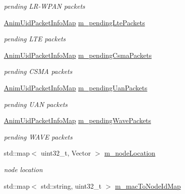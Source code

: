 \begin{DoxyCompactItemize}
\begin{DoxyCompactList}\small\item\em pending L\+R-\/\+W\+P\+AN packets \end{DoxyCompactList}\item 
\hyperlink{classns3_1_1AnimationInterface_afea577896009c4134df836bc20f1eabe}{Anim\+Uid\+Packet\+Info\+Map} \hyperlink{classns3_1_1AnimationInterface_abc07805734a4f250a8c791730cdffd67}{m\+\_\+pending\+Lte\+Packets}
\begin{DoxyCompactList}\small\item\em pending L\+TE packets \end{DoxyCompactList}\item 
\hyperlink{classns3_1_1AnimationInterface_afea577896009c4134df836bc20f1eabe}{Anim\+Uid\+Packet\+Info\+Map} \hyperlink{classns3_1_1AnimationInterface_ae80a577d450396d34df2499ec2c3c6ec}{m\+\_\+pending\+Csma\+Packets}
\begin{DoxyCompactList}\small\item\em pending C\+S\+MA packets \end{DoxyCompactList}\item 
\hyperlink{classns3_1_1AnimationInterface_afea577896009c4134df836bc20f1eabe}{Anim\+Uid\+Packet\+Info\+Map} \hyperlink{classns3_1_1AnimationInterface_a5630debe0e6c9a2421a311a6ebe8d396}{m\+\_\+pending\+Uan\+Packets}
\begin{DoxyCompactList}\small\item\em pending U\+AN packets \end{DoxyCompactList}\item 
\hyperlink{classns3_1_1AnimationInterface_afea577896009c4134df836bc20f1eabe}{Anim\+Uid\+Packet\+Info\+Map} \hyperlink{classns3_1_1AnimationInterface_a19f55ec0186539c05b68cdcb45ce262d}{m\+\_\+pending\+Wave\+Packets}
\begin{DoxyCompactList}\small\item\em pending W\+A\+VE packets \end{DoxyCompactList}\item 
std\+::map$<$ uint32\+\_\+t, Vector $>$ \hyperlink{classns3_1_1AnimationInterface_a4ff501bdb4d16525b521e7f42fe563f4}{m\+\_\+node\+Location}
\begin{DoxyCompactList}\small\item\em node location \end{DoxyCompactList}\item 
std\+::map$<$ std\+::string, uint32\+\_\+t $>$ \hyperlink{classns3_1_1AnimationInterface_a4d47d5b16cac7965cc0fbb1c50b3a268}{m\+\_\+mac\+To\+Node\+Id\+Map}

\end{DoxyCompactItemize}
